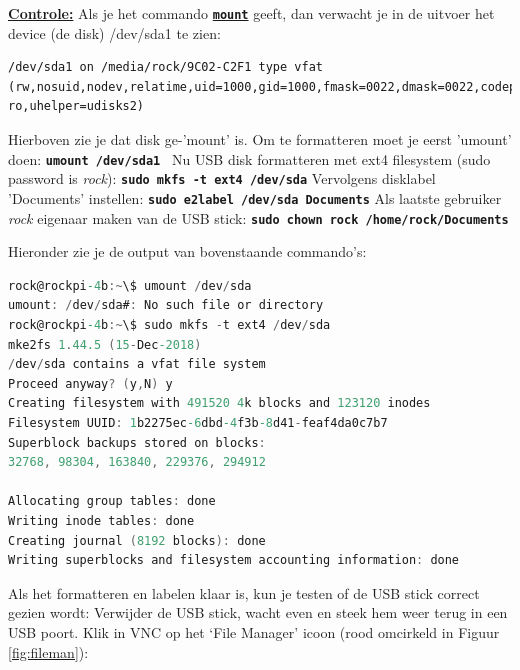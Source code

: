 \underline{\textbf{Controle:}}\newline 
Als je het commando \href{https://www.techrepublic.com/article/linux-101-what-is-the-mount-command-and-how-do-you-use-it/}{\textbf{\texttt{mount}}} geeft, dan verwacht je in de uitvoer het device (de disk) /dev/sda1 te zien: %
\begin{lstlisting}
/dev/sda1 on /media/rock/9C02-C2F1 type vfat (rw,nosuid,nodev,relatime,uid=1000,gid=1000,fmask=0022,dmask=0022,codepage=936,iocharset=utf8,shortname=mixed,showexec,utf8,flush,errors=remount-ro,uhelper=udisks2)
\end{lstlisting}

Hierboven zie je dat disk ge-'mount' is. Om te formatteren moet je eerst 'umount' doen:\newline
\textbf{\texttt{umount /dev/sda1 }}\newline
Nu USB disk formatteren met ext4 filesystem (sudo password is \textit{rock}):\newline
\textbf{\texttt{sudo mkfs -t ext4 /dev/sda}}\newline
Vervolgens disklabel 'Documents' instellen:\newline
\textbf{\texttt{sudo e2label /dev/sda Documents}}\newline
Als laatste gebruiker \textit{rock} eigenaar maken van de USB stick:\newline
\textbf{\texttt{sudo chown rock /home/rock/Documents}}\newline

Hieronder zie je de output van bovenstaande commando's:
	
\begin{lstlisting}[language=C]   % Gert: Is het niet, maar hiermee doet hij geen speciale opmaak
rock@rockpi-4b:~\$ umount /dev/sda
umount: /dev/sda#: No such file or directory
rock@rockpi-4b:~\$ sudo mkfs -t ext4 /dev/sda
mke2fs 1.44.5 (15-Dec-2018)
/dev/sda contains a vfat file system
Proceed anyway? (y,N) y
Creating filesystem with 491520 4k blocks and 123120 inodes
Filesystem UUID: 1b2275ec-6dbd-4f3b-8d41-feaf4da0c7b7
Superblock backups stored on blocks:
32768, 98304, 163840, 229376, 294912

Allocating group tables: done
Writing inode tables: done
Creating journal (8192 blocks): done
Writing superblocks and filesystem accounting information: done
\end{lstlisting}

Als het formatteren en labelen klaar is, kun je testen of de USB stick correct gezien wordt:\newline
Verwijder de USB stick, wacht even en steek hem weer terug in een USB poort.\newline
Klik in VNC op het ‘File Manager’ icoon (rood omcirkeld in Figuur \ref{fig:fileman}):

